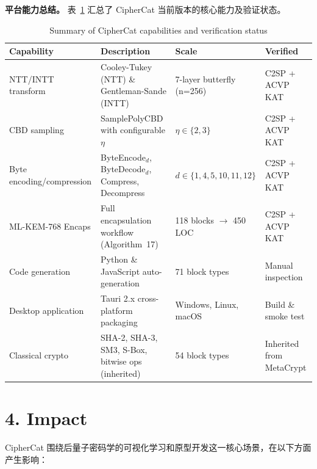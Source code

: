 \documentclass[preprint,12pt,a4paper]{elsarticle}
\begin{document}
\medskip
\textbf{平台能力总结。} 表~\ref{tab:capabilities} 汇总了 CipherCat 当前版本的核心能力及验证状态。

\begin{table}[htbp]
	\centering
	\caption{Summary of CipherCat capabilities and verification status}
	\label{tab:capabilities}
	\begin{tabular}{|l|p{6cm}|l|l|}
		\hline
		\textbf{Capability}       & \textbf{Description}                                 & \textbf{Scale}                   & \textbf{Verified}        \\
		\hline
		NTT/INTT transform        & Cooley-Tukey (NTT) \& Gentleman-Sande (INTT)         & 7-layer butterfly (n=256)        & C2SP + ACVP KAT          \\
		\hline
		CBD sampling              & SamplePolyCBD with configurable $\eta$               & $\eta \in \{2, 3\}$              & C2SP + ACVP KAT          \\
		\hline
		Byte encoding/compression & ByteEncode$_d$, ByteDecode$_d$, Compress, Decompress & $d \in \{1,4,5,10,11,12\}$       & C2SP + ACVP KAT          \\
		\hline
		ML-KEM-768 Encaps         & Full encapsulation workflow (Algorithm~17)           & 118 blocks $\rightarrow$ 450 LOC & C2SP + ACVP KAT          \\
		\hline
		Code generation           & Python \& JavaScript auto-generation                 & 71 block types                   & Manual inspection        \\
		\hline
		Desktop application       & Tauri 2.x cross-platform packaging                   & Windows, Linux, macOS            & Build \& smoke test      \\
		\hline
		Classical crypto          & SHA-2, SHA-3, SM3, S-Box, bitwise ops (inherited)    & 54 block types                   & Inherited from MetaCrypt \\
		\hline
	\end{tabular}
\end{table}

\section*{4. Impact}

CipherCat 围绕后量子密码学的可视化学习和原型开发这一核心场景，在以下方面产生影响：
\end{document}
